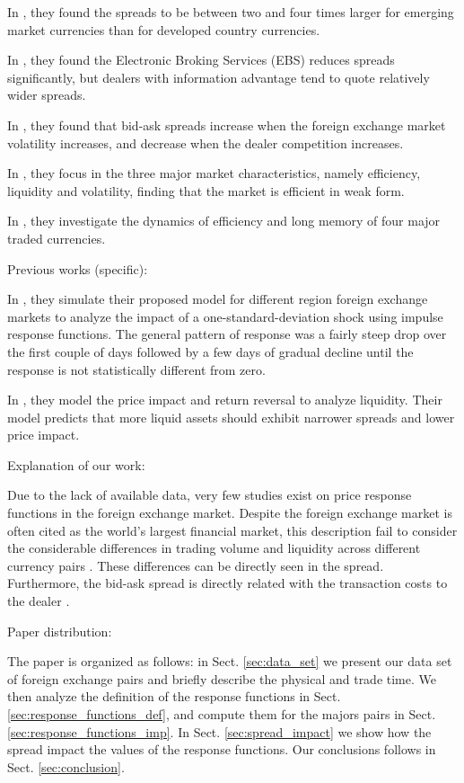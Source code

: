 In \cite{curr_speculation}, they found the spreads to be between two and four
times larger for emerging market currencies than for developed country currencies.

In \cite{electronic_forex}, they found the Electronic Broking Services (EBS)
reduces spreads significantly, but dealers with information advantage tend to
quote relatively wider spreads.

In \cite{spread_competition}, they found that bid-ask spreads increase when the
foreign exchange market volatility increases, and decrease when the dealer
competition increases.

In \cite{intraday_forex}, they focus in the three major market characteristics,
namely efficiency, liquidity and volatility, finding that the market is
efficient in weak form.

In \cite{forex_inefficiency}, they investigate the dynamics of efficiency and
long memory of four major traded currencies.




Previous works (specific):

In \cite{forex_volatility}, they simulate their proposed model for different
region foreign exchange markets to analyze the
impact of a one-standard-deviation shock using impulse response functions. The
general pattern of response was a fairly steep drop over the first couple of
days followed by a few days of gradual decline until the response is not
statistically different from zero.

In \cite{forex_liquidity}, they model the price impact and return reversal to
analyze liquidity. Their model predicts that more liquid assets should exhibit
narrower spreads and lower price impact.




Explanation of our work:

Due to the lack of available data, very few studies exist on price response functions in the foreign exchange
market.
Despite the foreign exchange market is often cited as the world's largest financial
market, this description fail to consider the considerable differences in trading
volume and liquidity across different currency pairs \cite{forex_microstructure}. These differences can be
directly seen in the spread. Furthermore, the bid-ask spread is directly related
with the transaction costs to the dealer \cite{teach_spread}.




Paper distribution:

The paper is organized as follows: in Sect. \ref{sec:data_set} we present our
data set of foreign exchange pairs and briefly describe the physical and trade time. We then
analyze the definition of the response functions in Sect.
\ref{sec:response_functions_def}, and compute them for the majors pairs in
Sect. \ref{sec:response_functions_imp}.
In Sect. \ref{sec:spread_impact} we show how the spread impact the values of the
response functions. Our conclusions follows in Sect. \ref{sec:conclusion}.